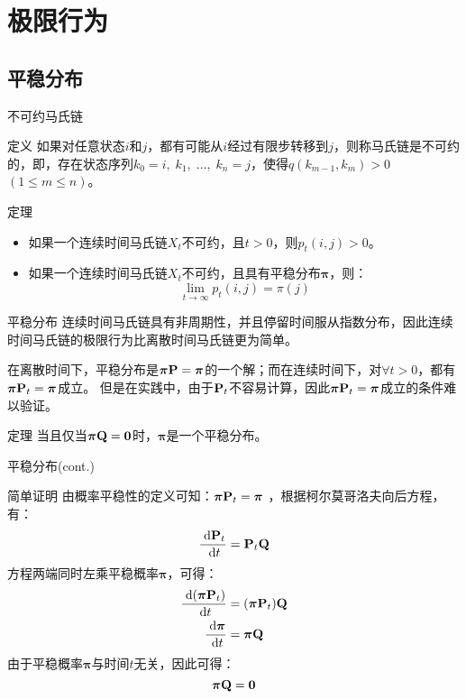 \documentclass[t]{beamer}
\newcommand{\dif}{{\;\rm d}}
\begin{document}
\section{极限行为}

\subsection{平稳分布}

\begin{frame}{不可约马氏链}
\begin{block}{定义}
  如果对任意状态$i$和$j$，都有可能从$i$经过有限步转移到$j$，则称马氏链是{不可约}的，即，存在状态序列$k_0=i,\; k_1,\;\ldots,\;k_n=j$，使得$q(k_{m-1},k_m)>0$ $(1\le m\le n)$。
\end{block}

\begin{block}{定理}
  \begin{itemize}
    \item 	如果一个连续时间马氏链$X_t$不可约，且$t>0$，则$p_t(i,j)>0$。
    \item 如果一个连续时间马氏链$X_t$不可约，且具有平稳分布$\bm{\pi}$，则：
    \[\lim_{t\to\infty}p_t(i,j)=\pi(j) \]
  \end{itemize}
\end{block}
\end{frame}


\begin{frame}{平稳分布}
  连续时间马氏链具有非周期性，并且停留时间服从指数分布，因此连续时间马氏链的极限行为比离散时间马氏链更为简单。

  在离散时间下，平稳分布是${\bm\pi}{\bf P}=\bm{\pi}$的一个解；而在连续时间下，对$\forall t>0$，都有${\bm\pi}{\bf P}_t=\bm{\pi}$成立。
但是在实践中，由于${\bf P}_t$不容易计算，因此${\bm\pi}{\bf P}_t=\bm{\pi}$成立的条件难以验证。  

\begin{block}{定理}
    当且仅当$\bm{\pi}{\bf Q}={\bf 0}$时，$\bm{\pi}$是一个平稳分布。
  \end{block}
\end{frame}

\begin{frame}{平稳分布(cont.)}
  \small
  \begin{block}{简单证明}
    由概率平稳性的定义可知：$\bm{\pi}{\bf P}_t=\bm{\pi}$
    ，根据柯尔莫哥洛夫向后方程，有：
    \[\frac{\dif {\bf P}_t}{\dif t}={\bf P}_t{\bf Q} \]
    方程两端同时左乘平稳概率$\bm{\pi}$，可得：
    \[\begin{split}
    \frac{\dif (\bm{\pi}{\bf P}_t)}{\dif t}&=(\bm{\pi}{\bf P}_t){\bf Q}\\
    \frac{\dif\bm{\pi}}{\dif t}&=\bm{\pi}{\bf Q}
    \end{split} \]
    由于平稳概率$\bm{\pi}$与时间$t$无关，因此可得：
    \begin{equation*}
    \bm{\pi}{\bf Q}={\bf 0}	
    \end{equation*}
    \end{block}
\end{frame}
\end{document}
